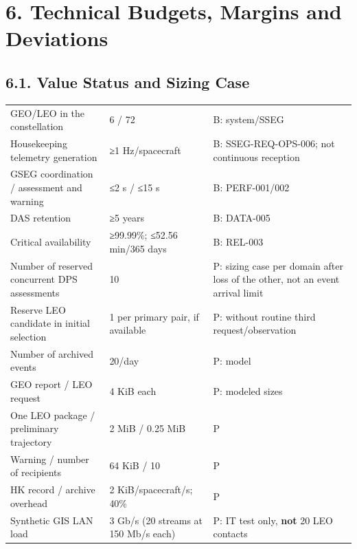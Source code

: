 \section{6. Technical Budgets, Margins and Deviations}\label{system-technical-budgets-margins-and-deviations}

\subsection{6.1. Value Status and Sizing Case}\label{budget-status-and-sizing-case}

\begingroup{}
\begin{longtable}{|P{0.39}|P{0.29}|P{0.32}|}
\hline{}
 &  & \\ \hline
\endhead
\hline\endlastfoot
GEO/\allowbreak{}LEO in the constellation & 6 /\allowbreak{} 72 & B: system/\allowbreak{}SSEG\\ \hline
Housekeeping telemetry generation & ≥1 Hz/\allowbreak{}spacecraft & B: SSEG-REQ-OPS-006; not continuous reception\\ \hline
GSEG coordination /\allowbreak{} assessment and warning & ≤2 s /\allowbreak{} ≤15 s & B: PERF-001/\allowbreak{}002\\ \hline
DAS retention & ≥5 years & B: DATA-005\\ \hline
Critical availability & ≥99.99\%; ≤52.56 min/\allowbreak{}365 days & B: REL-003\\ \hline
Number of reserved concurrent DPS assessments & 10 & P: sizing case per domain after loss of the other, not an event arrival limit\\ \hline
Reserve LEO candidate in initial selection & 1 per primary pair, if available & P: without routine third request/\allowbreak{}observation\\ \hline
Number of archived events & 20/\allowbreak{}day & P: model\\ \hline
GEO report /\allowbreak{} LEO request & 4 KiB each & P: modeled sizes\\ \hline
One LEO package /\allowbreak{} preliminary trajectory & 2 MiB /\allowbreak{} 0.25 MiB & P\\ \hline
Warning /\allowbreak{} number of recipients & 64 KiB /\allowbreak{} 10 & P\\ \hline
HK record /\allowbreak{} archive overhead & 2 KiB/\allowbreak{}spacecraft/\allowbreak{}s; 40\% & P\\ \hline
Synthetic GIS LAN load & 3 Gb/\allowbreak{}s (20 streams at 150 Mb/\allowbreak{}s each) & P: IT test only, \textbf{not} 20 LEO contacts\\*
\end{longtable}
\endgroup

